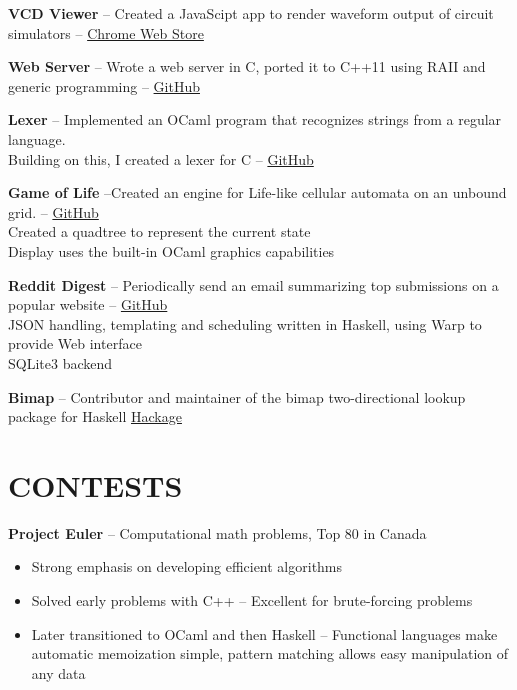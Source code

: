 \documentclass{res}
\begin{document}
\begin{resume}
    {\bf VCD Viewer} -- Created a JavaScipt app to render waveform output of circuit simulators --
    \href{https://chrome.google.com/webstore/detail/vcd-viewer/fpacodjpmmabkjooobgbpgpmgbfjidkg?hl=en-US}{Chrome Web Store}
    \vspace{-3mm}

    {\bf Web Server} -- Wrote a web server in C, ported it to C++11 using RAII and generic programming --
    \href{https://www.github.com/joelwilliamson/JServer}{GitHub}
    \vspace{-3mm}

    {\bf Lexer} -- Implemented an OCaml program that recognizes strings from a regular language.\\
    \hspace*{10mm}  Building on this, I created a lexer for C --
    \href{https://www.github.com/joelwilliamson/ndfa}{GitHub}
    \vspace{-3mm}

    {\bf Game of Life} --Created an engine for Life-like cellular automata on an unbound grid. --
    \href{https://www.github.com/joelwilliamson/life}{GitHub} \\
    \hspace*{10mm}  Created a quadtree to represent the current state \\
    \hspace*{10mm}  Display uses the built-in OCaml graphics capabilities
    \vspace{-3mm}

    {\bf Reddit Digest} -- Periodically send an email summarizing top submissions on a popular website --
    \href{https://github.com/joelwilliamson/reddit-digest}{GitHub}\\
    \hspace*{10mm}  JSON handling, templating and scheduling written in Haskell, using Warp to provide Web interface \\
    \hspace*{10mm}  SQLite3 backend
    \vspace{-3mm}

    {\bf Bimap} -- Contributor and maintainer of the bimap two-directional lookup package for Haskell
    \href{http://hackage.haskell.org/package/bimap-0.3.0}{Hackage}
    \pagebreak 
\section{CONTESTS}
\vspace{3mm}
        {\bf Project Euler} -- Computational math problems, Top 80 in Canada
        \begin{itemize}
          \item Strong emphasis on developing efficient algorithms
          \item Solved early problems with C++ -- Excellent for brute-forcing problems
          \item Later transitioned to OCaml and then Haskell --
            Functional languages make automatic memoization simple, pattern matching allows easy manipulation of any data
        \end{itemize}


\end{resume}
\end{document}
